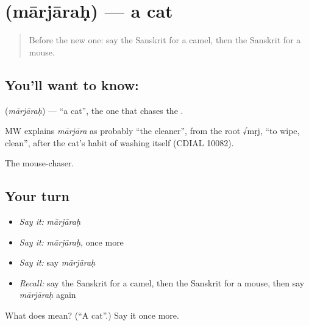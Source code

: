 \section[\texorpdfstring{\sk{मार्जारः} (mārjāraḥ)}{मार्जारः (mārjāraḥ)}]{ (mārjāraḥ) — a cat}

\label{lesson:SA-C79-cat}



\begin{quote}
Before the new one: say the Sanskrit for a camel, then the Sanskrit for a mouse.
\end{quote}

\subsection*{You'll want to know: }
\textbf{} (\emph{mārjāraḥ}) — \textquotedblleft{}a cat\textquotedblright{}, the one that chases the \textbf{}.

\begin{cousinweb}
MW explains \emph{mārjāra} as probably \textquotedblleft{}the cleaner\textquotedblright{}, from the root √mṛj, \textquotedblleft{}to wipe, clean\textquotedblright{}, after the cat's habit of washing itself (CDIAL 10082).
\end{cousinweb}

\begin{grammarlens}[title={What you've built}]
The mouse-chaser.
\end{grammarlens}

\subsection*{Your turn}
\begin{itemize}
\raggedright
  \item \emph{Say it:} \emph{mārjāraḥ}
  \item \emph{Say it:} \emph{mārjāraḥ}, once more
  \item \emph{Say it:} say \emph{mārjāraḥ}
  \item \emph{Recall:} say the Sanskrit for a camel, then the Sanskrit for a mouse, then say \emph{mārjāraḥ} again
\end{itemize}

\begin{tcolorbox}[breakable,colback=teal!4,colframe=teal!35!black,title={Before you move on}]
What does  mean? (\textquotedblleft{}A cat\textquotedblright{}.) Say it once more.
\end{tcolorbox}
